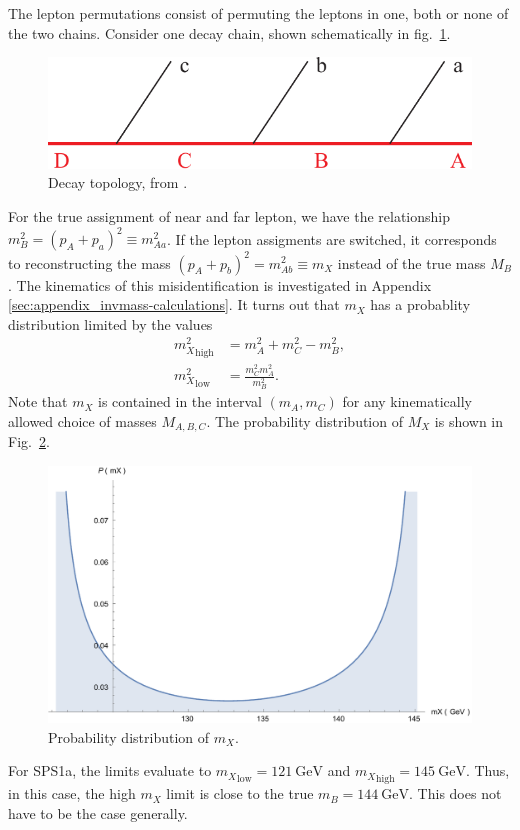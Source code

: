 \documentclass[twoside,english]{uiofysmaster}
\begin{document}
The lepton permutations consist of permuting the leptons in one, both or none of the two chains. Consider one decay chain, shown schematically in fig.\ \ref{fig:decaytree_improvementchap}.
\begin{figure}[hbt]
\centering
\includegraphics[scale=0.7]{figures/fig-chain.pdf} %
\caption{Decay topology, from \cite{Miller:2005zp}.}
\label{fig:decaytree_improvementchap}
\end{figure} 
For the true assignment of near and far lepton, we have the relationship $m^2_B = (p_A + p_a)^2 \equiv m^2_{Aa}$. If the lepton assigments are switched, it corresponds to reconstructing the mass $(p_A + p_b)^2 = m^2_{Ab} \equiv m_X$ instead of the true mass $M_B$. The kinematics of this misidentification is investigated in Appendix \ref{sec:appendix_invmass-calculations}. It turns out that $m_X$ has a probablity distribution limited by the values 
\begin{align}
	{m_X^2}_\mathrm{high} &= m_A^2 + m_C^2 - m_B^2,\\
	{m_X^2}_\mathrm{low} &= \frac{m_C^2 m_A^2}{m_B^2}.\nonumber
\end{align}
Note that $m_X$ is contained in the interval $(m_A, m_C)$ for any kinematically allowed choice of masses $M_{A,B,C}.$ The probability distribution of $M_X$ is shown in Fig.\ \ref{fig:mX-dist_improvementchap}.
\begin{figure}[hbt]
\centering
\includegraphics[scale=0.4]{figures/appendix/mX-distribution.pdf}
\caption{Probability distribution of $m_X$.}
\label{fig:mX-dist_improvementchap}
\end{figure}
For SPS1a, the limits evaluate to ${m_X}_\mathrm{low} = 121~\mathrm{GeV}$ and ${m_X}_\mathrm{high} = 145 ~\mathrm{GeV}$. Thus, in this case, the high $m_X$ limit is close to the true $m_B = 144 ~\mathrm{GeV}$. This does not have to be the case generally. 
\end{document}
